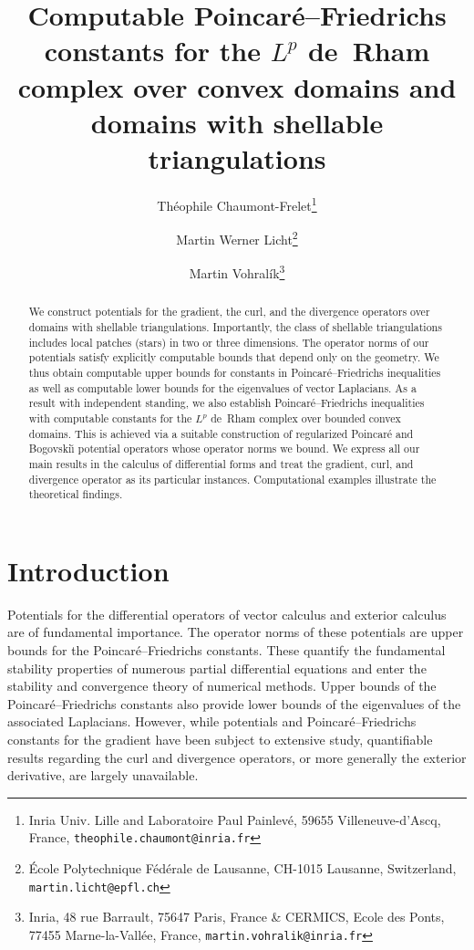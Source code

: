 \documentclass[10pt,a4paper]{article}
\title{Computable Poincar\'e--Friedrichs constants for the $L^{p}$ de~Rham complex over convex domains and domains with shellable triangulations}
\author{
    Th\'eophile Chaumont-Frelet\thanks{Inria Univ. Lille and Laboratoire Paul Painlev\'e, 59655 Villeneuve-d'Ascq, France, \texttt{theophile.chaumont@inria.fr}} \and
    Martin Werner Licht\thanks{\'Ecole Polytechnique F\'ed\'erale de Lausanne, CH-1015 Lausanne, Switzerland, \texttt{martin.licht@epfl.ch}} \and
    Martin Vohral\'ik\thanks{Inria, 48 rue Barrault, 75647 Paris, France \& CERMICS, Ecole des Ponts, 77455 Marne-la-Vall\'ee, France, \texttt{martin.vohralik@inria.fr}}
}
\date{}
\begin{document}
\maketitle

\begin{abstract}
    We construct potentials for the gradient, the curl, and the divergence operators over domains with shellable triangulations. 
    Importantly, the class of shellable triangulations includes local patches (stars) in two or three dimensions. 
    The operator norms of our potentials satisfy explicitly computable bounds that depend only on the geometry. 
    We thus obtain computable upper bounds for constants in Poincar\'e--Friedrichs inequalities as well as computable lower bounds for the eigenvalues of vector Laplacians. 
    As a result with independent standing, we also establish Poincar\'e--Friedrichs inequalities with computable constants for the $L^{p}$ de~Rham complex over bounded convex domains. 
    This is achieved via a suitable construction of regularized Poincar\'e and Bogovski\u{\i} potential operators whose operator norms we bound.
    We express all our main results in the calculus of differential forms and treat the gradient, curl, and divergence operator as its particular instances. 
    Computational examples illustrate the theoretical findings.
\end{abstract}


 



\section{Introduction}\label{section:intro}

Potentials for the differential operators of vector calculus and exterior calculus are of fundamental importance. 
The operator norms of these potentials are upper bounds for the Poincar\'e--Friedrichs constants.
These quantify the fundamental stability properties of {numerous} partial differential equations %
and enter the stability and convergence theory of numerical methods. 
Upper bounds of the Poincar\'e--Friedrichs constants also provide lower bounds of the eigenvalues of the associated Laplacians.
However, while potentials and Poincar\'e--Friedrichs constants for the gradient have been subject to extensive study,
quantifiable results regarding the curl and divergence operators, or more generally the exterior derivative, are largely unavailable.
\end{document}
